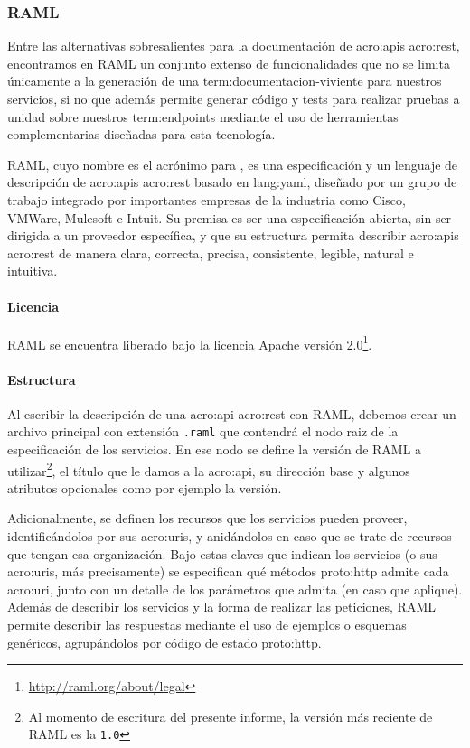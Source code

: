 \subsubsection{RAML}
\label{soa:tecnologias:raml}

Entre las alternativas sobresalientes para la documentación de \glspl{acro:api} \gls{acro:rest}, encontramos en RAML un conjunto extenso de funcionalidades que no se limita únicamente a la generación de una \gls{term:documentacion-viviente} para nuestros servicios, si no que además permite generar código y tests para realizar pruebas a unidad sobre nuestros \glspl{term:endpoint} mediante el uso de herramientas complementarias diseñadas para esta tecnología.

RAML, cuyo nombre es el acrónimo para , es una especificación y un lenguaje de descripción de \glspl{acro:api} \gls{acro:rest} basado en \gls{lang:yaml}, diseñado por un grupo de trabajo integrado por importantes empresas de la industria como Cisco, VMWare, Mulesoft e Intuit. Su premisa es ser una especificación abierta, sin ser dirigida a un proveedor específica, y que su estructura permita describir \glspl{acro:api} \gls{acro:rest} de manera clara, correcta, precisa, consistente, legible, natural e intuitiva.

\paragraph{Licencia}

RAML se encuentra liberado bajo la licencia Apache versión 2.0\footnote{\url{http://raml.org/about/legal}}.

\paragraph{Estructura}

Al escribir la descripción de una \gls{acro:api} \gls{acro:rest} con RAML, debemos crear un archivo principal con extensión \texttt{.raml} que contendrá el nodo raiz de la especificación de los servicios. En ese nodo se define la versión de RAML a utilizar\footnote{Al momento de escritura del presente informe, la versión más reciente de RAML es la \texttt{1.0}}, el título que le damos a la \gls{acro:api}, su dirección base y algunos atributos opcionales como por ejemplo la versión.

Adicionalmente, se definen los recursos que los servicios pueden proveer, identificándolos por sus \glspl{acro:uri}, y anidándolos en caso que se trate de recursos que tengan esa organización. Bajo estas claves que indican los servicios (o sus \glspl{acro:uri}, más precisamente) se especifican qué métodos \gls{proto:http} admite cada \gls{acro:uri}, junto con un detalle de los parámetros que admita (en caso que aplique). Además de describir los servicios y la forma de realizar las peticiones, RAML permite describir las respuestas mediante el uso de ejemplos o esquemas genéricos, agrupándolos por código de estado \gls{proto:http}.

